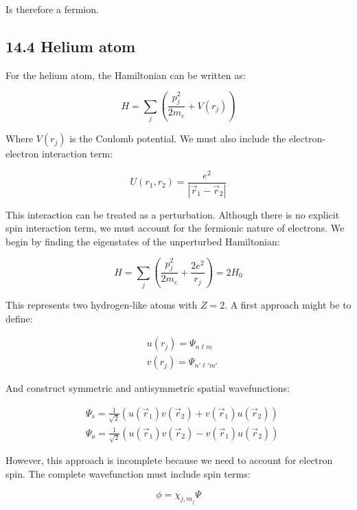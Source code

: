 \documentclass[10pt]{article}
\begin{document}
Is therefore a fermion.

\subsection*{14.4 Helium atom}
For the helium atom, the Hamiltonian can be written as:

\begin{equation*}
H=\sum_j(\frac{p_j^2}{2m_e}+V(r_j)) \tag{14.31}
\end{equation*}

Where $V(r_j)$ is the Coulomb potential. We must also include the electron-electron interaction term:

\begin{equation*}
U(r_1,r_2)=\frac{e^2}{|\vec{r}_1-\vec{r}_2|} \tag{14.32}
\end{equation*}

This interaction can be treated as a perturbation. Although there is no explicit spin interaction term, we must account for the fermionic nature of electrons. We begin by finding the eigenstates of the unperturbed Hamiltonian:

\begin{equation*}
H=\sum_j(\frac{p_j^2}{2m_e}+\frac{2e^2}{r_j})=2H_0 \tag{14.33}
\end{equation*}

This represents two hydrogen-like atoms with $Z=2$. A first approach might be to define:

\begin{align*}
&u(r_j)=\Psi_{n\ell m} \tag{14.34}\\
&v(r_j)=\Psi_{n'\ell'm'}
\end{align*}

And construct symmetric and antisymmetric spatial wavefunctions:

\begin{align*}
&\Psi_s=\frac{1}{\sqrt{2}}(u(\vec{r}_1)v(\vec{r}_2)+v(\vec{r}_1)u(\vec{r}_2)) \tag{14.35}\\
&\Psi_a=\frac{1}{\sqrt{2}}(u(\vec{r}_1)v(\vec{r}_2)-v(\vec{r}_1)u(\vec{r}_2))
\end{align*}

However, this approach is incomplete because we need to account for electron spin. The complete wavefunction must include spin terms:

\begin{equation*}
\phi=\chi_{j,m_j}\Psi \tag{14.36}
\end{equation*}
\end{document}

